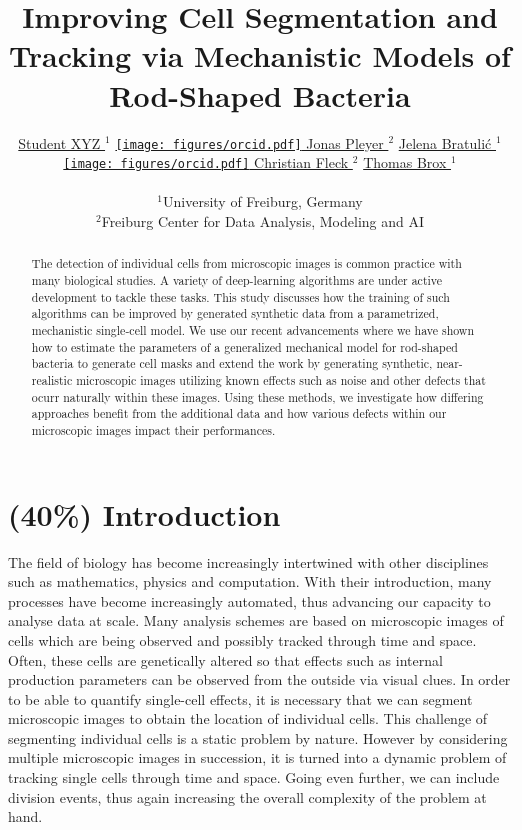 \documentclass{article}
\title{Improving Cell Segmentation and Tracking via Mechanistic Models of
Rod-Shaped Bacteria}
\author{
    \href{https://orcid.org/0009-0001-0613-7978}{
        \hspace{1mm}Student XYZ
    }$^1$
    \href{https://orcid.org/0009-0001-0613-7978}{
        \texttt{[image: figures/orcid.pdf]}
        \hspace{1mm}Jonas Pleyer
    }$^2$
    \href{https://orcid.org/0009-0001-0613-7978}{
        \hspace{1mm}Jelena Bratulić
    }$^1$
	\href{https://orcid.org/0000-0002-6371-4495}{
        \texttt{[image: figures/orcid.pdf]}
        \hspace{1mm}Christian Fleck
    }$^2$
	\href{https://orcid.org/0000-0002-6371-4495}{
        \hspace{1mm}Thomas Brox
    }$^1$\\\\
    $^1$University of Freiburg, Germany\\
    $^2$Freiburg Center for Data Analysis, Modeling and AI\\
}
\begin{document}
\maketitle

\begin{abstract}
    The detection of individual cells from microscopic images is common practice with many
    biological studies.
    A variety of deep-learning algorithms are under active development to tackle these tasks.
    This study discusses how the training of such algorithms can be improved by generated synthetic
    data from a parametrized, mechanistic single-cell model.
    We use our recent advancements where we have shown how to estimate the parameters of a
    generalized mechanical model for rod-shaped bacteria to generate cell masks and extend the work
    by generating synthetic, near-realistic microscopic images utilizing known effects such as noise
    and other defects that ocurr naturally within these images.
    Using these methods, we investigate how differing approaches benefit from the additional data
    and how various defects within our microscopic images impact their performances.
\end{abstract}


\vfill
\pagebreak
\renewcommand{\contentsname}{Table of Contents (remove before submission)}
\tableofcontents
\vfill
\pagebreak

\section{(40\%) Introduction}

The field of biology has become increasingly intertwined with other disciplines such as mathematics,
physics and computation.
With their introduction, many processes have become increasingly automated, thus advancing our
capacity to analyse data at scale.
Many analysis schemes are based on microscopic images of cells which are being observed and possibly
tracked through time and space.
Often, these cells are genetically altered so that effects such as internal production parameters
can be observed from the outside via visual clues.
In order to be able to quantify single-cell effects, it is necessary that we can segment microscopic
images to obtain the location of individual cells.
This challenge of segmenting individual cells is a static problem by nature.
However by considering multiple microscopic images in succession, it is turned into a dynamic
problem of tracking single cells through time and space.
Going even further, we can include division events, thus again increasing the overall complexity of
the problem at hand.
\end{document}
